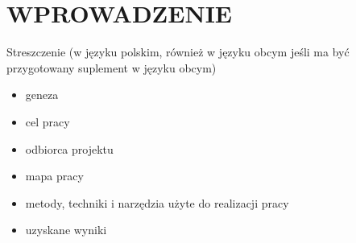 \section{WPROWADZENIE}
Streszczenie (w języku polskim, również w języku obcym jeśli ma być przygotowany
suplement w języku obcym)
\begin{itemize}
\item geneza
\item cel pracy
\item odbiorca projektu
\item mapa pracy
\item metody, techniki i narzędzia użyte do realizacji pracy
\item uzyskane wyniki
\end{itemize}
\newpage
